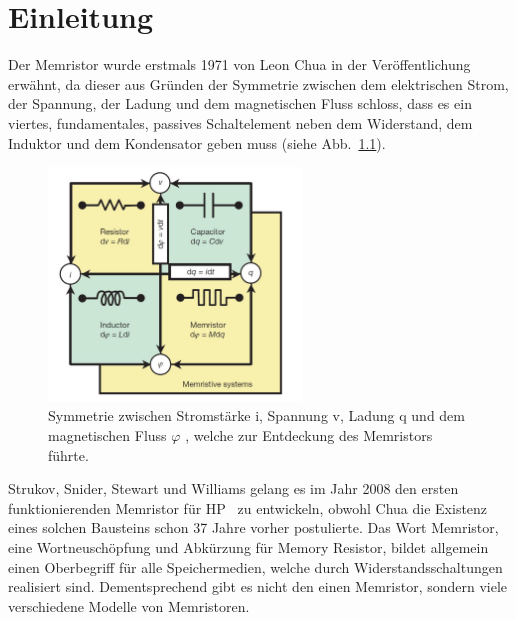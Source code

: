 

\chapter{Einleitung}
\label{sec:Chapter1}


Der Memristor wurde erstmals 1971 von Leon Chua in der Veröffentlichung~\cite{chua_mem} erwähnt, da dieser aus Gründen der Symmetrie zwischen dem elektrischen Strom, der Spannung, der Ladung und dem magnetischen Fluss schloss, dass es ein viertes, fundamentales, passives Schaltelement neben dem Widerstand, dem Induktor und dem Kondensator geben muss (siehe Abb.~\ref{fig:sym_mem}).

\begin{figure}
  \centering
    \includegraphics[width=0.6\textwidth]{images/symmetrie_memristor.JPG}
  \caption{Symmetrie zwischen Stromstärke i, Spannung v, Ladung q und dem magnetischen Fluss $\varphi$ , welche zur Entdeckung des Memristors führte.}
  \label{fig:sym_mem}
\end{figure}

Strukov, Snider, Stewart und Williams gelang es im Jahr 2008 den ersten funktionierenden Memristor für HP~\cite{hp_2008} zu entwickeln, obwohl Chua die Existenz eines solchen Bausteins schon 37 Jahre vorher postulierte. Das Wort \glqq Memristor\grqq, eine Wortneuschöpfung und Abkürzung für \glqq Memory Resistor\grqq, bildet allgemein einen Oberbegriff für alle Speichermedien, welche durch Widerstandsschaltungen realisiert sind. Dementsprechend gibt es nicht den einen Memristor, sondern viele verschiedene Modelle von Memristoren.

